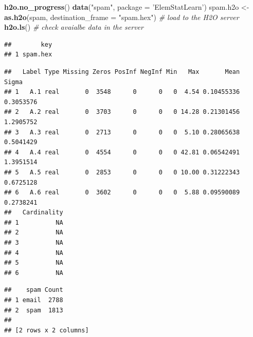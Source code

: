 \documentclass[]{book}
\newenvironment{Shaded}{\begin{snugshade}}{\end{snugshade}}
\newcommand{\CommentTok}[1]{\textcolor[rgb]{0.56,0.35,0.01}{\textit{#1}}}
\newcommand{\DataTypeTok}[1]{\textcolor[rgb]{0.13,0.29,0.53}{#1}}
\newcommand{\KeywordTok}[1]{\textcolor[rgb]{0.13,0.29,0.53}{\textbf{#1}}}
\newcommand{\NormalTok}[1]{#1}
\newcommand{\OperatorTok}[1]{\textcolor[rgb]{0.81,0.36,0.00}{\textbf{#1}}}
\newcommand{\StringTok}[1]{\textcolor[rgb]{0.31,0.60,0.02}{#1}}
\theoremstyle{definition}
\theoremstyle{definition}
\theoremstyle{definition}
\theoremstyle{remark}
\begin{document}
\begin{Shaded}
\begin{Highlighting}[]
\KeywordTok{h2o.no_progress}\NormalTok{()}
\KeywordTok{data}\NormalTok{(}\StringTok{"spam"}\NormalTok{, }\DataTypeTok{package =} \StringTok{'ElemStatLearn'}\NormalTok{)}
\NormalTok{spam.h2o <-}\StringTok{ }\KeywordTok{as.h2o}\NormalTok{(spam, }\DataTypeTok{destination_frame =} \StringTok{"spam.hex"}\NormalTok{) }\CommentTok{# load to the H2O server}
\KeywordTok{h2o.ls}\NormalTok{() }\CommentTok{# check avaialbe data in the server}
\end{Highlighting}
\end{Shaded}

\begin{verbatim}
##        key
## 1 spam.hex
\end{verbatim}

\begin{Shaded}
\end{Shaded}

\begin{verbatim}
##   Label Type Missing Zeros PosInf NegInf Min   Max       Mean     Sigma
## 1   A.1 real       0  3548      0      0   0  4.54 0.10455336 0.3053576
## 2   A.2 real       0  3703      0      0   0 14.28 0.21301456 1.2905752
## 3   A.3 real       0  2713      0      0   0  5.10 0.28065638 0.5041429
## 4   A.4 real       0  4554      0      0   0 42.81 0.06542491 1.3951514
## 5   A.5 real       0  2853      0      0   0 10.00 0.31222343 0.6725128
## 6   A.6 real       0  3602      0      0   0  5.88 0.09590089 0.2738241
##   Cardinality
## 1          NA
## 2          NA
## 3          NA
## 4          NA
## 5          NA
## 6          NA
\end{verbatim}

\begin{Shaded}
\end{Shaded}

\begin{verbatim}
##    spam Count
## 1 email  2788
## 2  spam  1813
## 
## [2 rows x 2 columns]
\end{verbatim}
\end{document}
